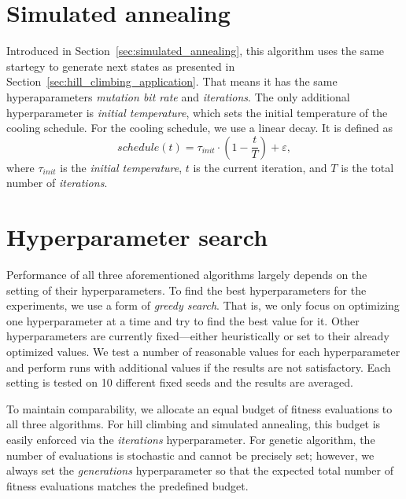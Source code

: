 \section{Simulated annealing} \label{sec:simulated_annealing_application}

Introduced in Section~\ref{sec:simulated_annealing}, this algorithm uses the same startegy to generate next states as presented in Section~\ref{sec:hill_climbing_application}. That means it has the same hyperaparameters \textit{mutation bit rate} and \textit{iterations}. The only additional hyperparameter is \textit{initial temperature}, which sets the initial temperature of the cooling schedule. For the cooling schedule, we use a linear decay. It is defined as
\begin{equation}
    schedule(t) = \tau_{init} \cdot \left(1 - \frac{t}{T}\right) + \varepsilon,
\end{equation}
where $\tau_{init}$ is the \textit{initial temperature}, $t$ is the current iteration, and $T$ is the total number of \textit{iterations}.

\section{Hyperparameter search} \label{sec:hyperparameter_search}

Performance of all three aforementioned algorithms largely depends on the setting of their hyperparameters.
To find the best hyperparameters for the experiments, we use a form of \textit{greedy search}. That is, we only focus on optimizing one hyperparameter at a time and try to find the best value for it. Other hyperparameters are currently fixed---either heuristically or set to their already optimized values.
We test a number of reasonable values for each hyperparameter and perform runs with additional values if the results are not satisfactory.
Each setting is tested on 10 different fixed seeds and the results are averaged.

To maintain comparability, we allocate an equal budget of fitness evaluations to all three algorithms. For hill climbing and simulated annealing, this budget is easily enforced via the \textit{iterations} hyperparameter. For genetic algorithm, the number of evaluations is stochastic and cannot be precisely set; however, we always set the \textit{generations} hyperparameter so that the expected total number of fitness evaluations matches the predefined budget.

